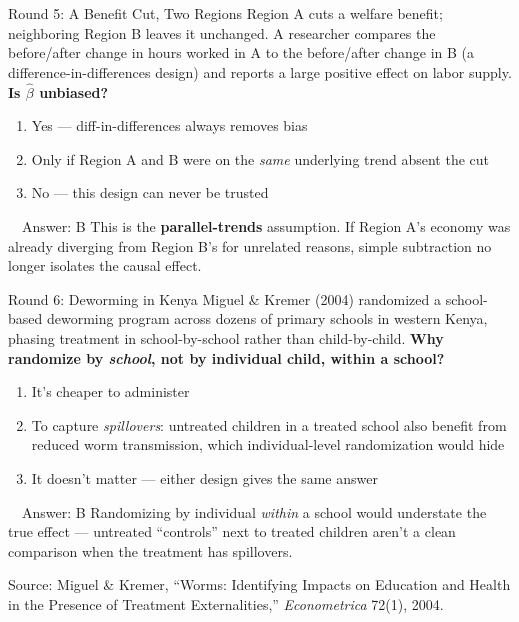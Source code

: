 \documentclass[11pt,aspectratio=169]{beamer}
\newcommand{\srcnote}[1]{{\footnotesize\color{wugray}Source: #1}}
\begin{document}
\begin{frame}{Round 5: A Benefit Cut, Two Regions}
  \small
  Region A cuts a welfare benefit; neighboring Region B leaves it unchanged. A researcher compares the before/after change in hours worked in A to the before/after change in B (a difference-in-differences design) and reports a large positive effect on labor supply.
  \vspace{0.5em}
  \textbf{Is \(\hat\beta\) unbiased?}
  \begin{enumerate}
    \item[\textbf{A}] Yes --- diff-in-differences always removes bias
    \item[\textbf{B}] Only if Region A and B were on the \emph{same} underlying trend absent the cut
    \item[\textbf{C}] No --- this design can never be trusted
  \end{enumerate}
  \pause
  \vspace{0.3em}
  \begin{alertblock}{\faCheckCircle\ \ Answer: B}
    This is the \textbf{parallel-trends} assumption. If Region A's economy was already diverging from Region B's for unrelated reasons, simple subtraction no longer isolates the causal effect.
  \end{alertblock}
\end{frame}

\begin{frame}{Round 6: Deworming in Kenya}
  \small
  Miguel \& Kremer (2004) randomized a school-based deworming program across dozens of primary schools in western Kenya, phasing treatment in school-by-school rather than child-by-child.
  \vspace{0.5em}
  \textbf{Why randomize by \emph{school}, not by individual child, within a school?}
  \begin{enumerate}
    \item[\textbf{A}] It's cheaper to administer
    \item[\textbf{B}] To capture \emph{spillovers}: untreated children in a treated school also benefit from reduced worm transmission, which individual-level randomization would hide
    \item[\textbf{C}] It doesn't matter --- either design gives the same answer
  \end{enumerate}
  \pause
  \vspace{0.3em}
  \begin{alertblock}{\faCheckCircle\ \ Answer: B}
    Randomizing by individual \emph{within} a school would understate the true effect --- untreated ``controls'' next to treated children aren't a clean comparison when the treatment has spillovers.
  \end{alertblock}
  \srcnote{Miguel \& Kremer, ``Worms: Identifying Impacts on Education and Health in the Presence of Treatment Externalities,'' \emph{Econometrica} 72(1), 2004.}
\end{frame}
\end{document}
